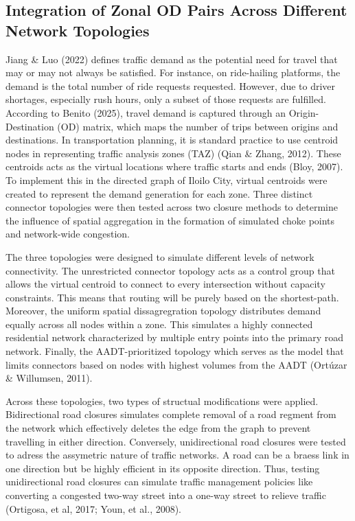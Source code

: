 \subsection{Integration of Zonal OD Pairs Across Different Network Topologies}
\label{sec:setups}


Jiang \& Luo (2022) defines traffic demand as the potential need for travel that may or may not always be satisfied. For instance, on ride-hailing platforms, the demand is the total number of ride requests requested. However, due to driver shortages, especially rush hours, only a subset of those requests are fulfilled. According to Benito (2025), travel demand is captured through an Origin-Destination (OD) matrix, which maps the number of trips between origins and destinations. In transportation planning, it is standard practice to use centroid nodes in representing traffic analysis zones (TAZ) (Qian \& Zhang, 2012). These centroids acts as the virtual locations where traffic starts and ends (Bloy, 2007). To implement this in the directed graph of Iloilo City, virtual centroids were created to represent the demand generation for each zone.  Three distinct connector topologies were then tested across two closure methods to determine the influence of spatial aggregation in the formation of simulated choke points and network-wide congestion. 

The three topologies were designed to simulate different levels of network connectivity. The unrestricted connector topology acts as a control group that allows the virtual centroid to connect to every intersection without capacity constraints. This means that routing will be purely based on the shortest-path. Moreover, the uniform spatial dissagregration topology distributes demand equally across all nodes within a zone. This simulates a highly connected residential network characterized by multiple entry points into the primary road network. Finally, the AADT-prioritized topology which serves as the model that limits connectors based on nodes with highest volumes from the AADT (Ortúzar \& Willumsen, 2011).

Across these topologies, two types of structual modifications were applied. Bidirectional road closures simulates complete removal of a road regment from the network which effectively deletes the edge from the graph to prevent travelling in either direction. Conversely, unidirectional road closures were tested to adress the assymetric nature of traffic networks. A road can be a braess link in one direction but be highly efficient in its opposite direction. Thus, testing unidirectional road closures can simulate traffic management policies like converting a congested two-way street into a one-way street to relieve traffic (Ortigosa, et al, 2017; Youn, et al., 2008).

